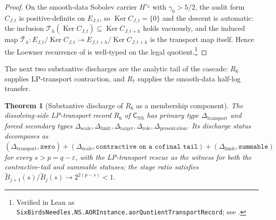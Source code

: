 \documentclass[11pt]{article}
\DeclareMathOperator{\Ker}{Ker}
\newcommand{\eps}{\varepsilon}
\newtheorem{theorem}{Theorem}[section]
\theoremstyle{definition}
\begin{document}
\begin{proof}
On the smooth-data Sobolev carrier \(H^{\gamma_0}\) with
\(\gamma_0>5/2\), the audit form \(C_{J,t}\) is
positive-definite on \(E_{J,t}\), so \(\Ker C_{J,t}=\{0\}\)
and the descent is automatic: the inclusion
\(\mathcal T_h(\Ker C_{J,t})\subseteq\Ker C_{J,t+h}\) holds
vacuously, and the induced map
\(\bar{\mathcal T}_h:E_{J,t}/\Ker C_{J,t}\to
E_{J,t+h}/\Ker C_{J,t+h}\) is the transport map itself.  Hence
the Loewner recurrence of
 is well-typed on
the legal quotient.\footnote{Verified in Lean as \texttt{SixBirdsNeedles.NS.AORInstance.aorQuotientTransportRecord}; see .}
\end{proof}

The next two substantive discharges are the analytic tail of the cascade:
\(R_6\) supplies LP-transport contraction, and \(R_7\) supplies the
smooth-data half-log transfer.

\begin{theorem}[Substantive discharge of $R_6$ as a membership component]\label{thm:ns:aor-r6-discharge}
The dissolving-side LP-transport record $R_6$ of $\mathsf C_{\mathrm{NS}}$ has primary type $\Delta_{\mathrm{transport}}$ and forced secondary types $\Delta_{\mathrm{scale}},\Delta_{\mathrm{limit}},\Delta_{\mathrm{target}},\Delta_{\mathrm{role}},\Delta_{\mathrm{presentation}}$.  Its discharge status decomposes as $(\Delta_{\mathrm{transport}},\texttt{zero})+(\Delta_{\mathrm{scale}},\texttt{contractive on a cofinal tail})+(\Delta_{\mathrm{limit}},\texttt{summable})$ for every $s>p=q-\eps$, with the LP-transport rescue  as the witness for both the contractive-tail and summable statuses; the stage ratio satisfies $\widetilde B_{j+1}(s)/\widetilde B_j(s)\to 2^{2(p-s)}<1$.
\end{theorem}
\end{document}
